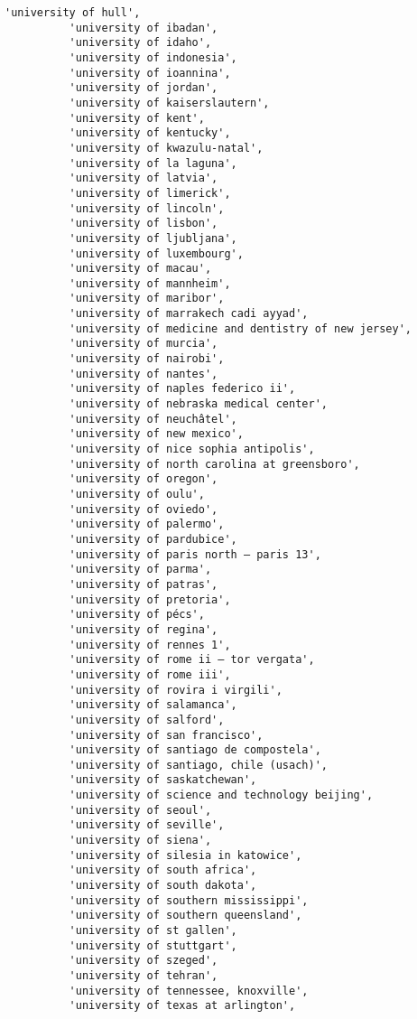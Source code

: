 \documentclass[11pt]{article}
\begin{document}
\begin{Verbatim}[commandchars=\\\{\}]
          'university of hull',
          'university of ibadan',
          'university of idaho',
          'university of indonesia',
          'university of ioannina',
          'university of jordan',
          'university of kaiserslautern',
          'university of kent',
          'university of kentucky',
          'university of kwazulu-natal',
          'university of la laguna',
          'university of latvia',
          'university of limerick',
          'university of lincoln',
          'university of lisbon',
          'university of ljubljana',
          'university of luxembourg',
          'university of macau',
          'university of mannheim',
          'university of maribor',
          'university of marrakech cadi ayyad',
          'university of medicine and dentistry of new jersey',
          'university of murcia',
          'university of nairobi',
          'university of nantes',
          'university of naples federico ii',
          'university of nebraska medical center',
          'university of neuchâtel',
          'university of new mexico',
          'university of nice sophia antipolis',
          'university of north carolina at greensboro',
          'university of oregon',
          'university of oulu',
          'university of oviedo',
          'university of palermo',
          'university of pardubice',
          'university of paris north – paris 13',
          'university of parma',
          'university of patras',
          'university of pretoria',
          'university of pécs',
          'university of regina',
          'university of rennes 1',
          'university of rome ii – tor vergata',
          'university of rome iii',
          'university of rovira i virgili',
          'university of salamanca',
          'university of salford',
          'university of san francisco',
          'university of santiago de compostela',
          'university of santiago, chile (usach)',
          'university of saskatchewan',
          'university of science and technology beijing',
          'university of seoul',
          'university of seville',
          'university of siena',
          'university of silesia in katowice',
          'university of south africa',
          'university of south dakota',
          'university of southern mississippi',
          'university of southern queensland',
          'university of st gallen',
          'university of stuttgart',
          'university of szeged',
          'university of tehran',
          'university of tennessee, knoxville',
          'university of texas at arlington',

\end{Verbatim}
\end{document}
